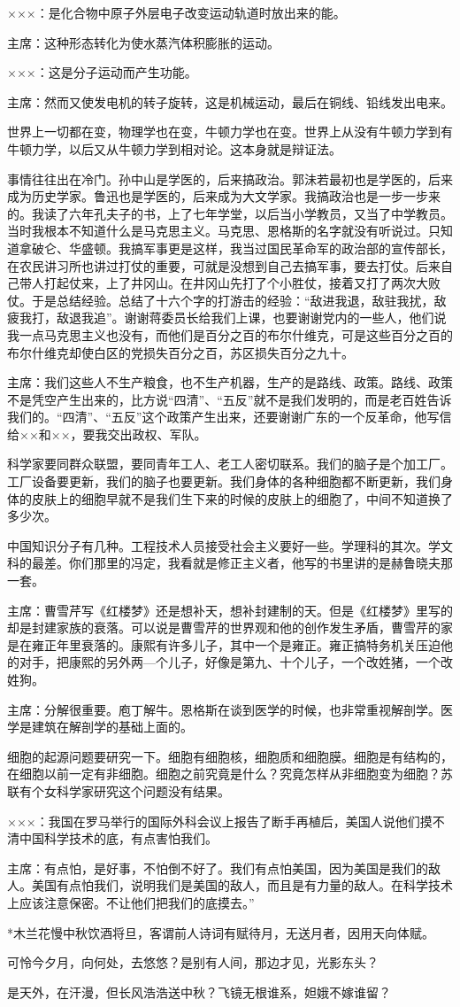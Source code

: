 ×××：是化合物中原子外层电子改变运动轨道时放出来的能。

主席：这种形态转化为使水蒸汽体积膨胀的运动。

×××：这是分子运动而产生功能。

主席：然而又使发电机的转子旋转，这是机械运动，最后在铜线、铅线发出电来。

世界上一切都在变，物理学也在变，牛顿力学也在变。世界上从没有牛顿力学到有牛顿力学，以后又从牛顿力学到相对论。这本身就是辩证法。

事情往往出在冷门。孙中山是学医的，后来搞政治。郭沬若最初也是学医的，后来成为历史学家。鲁迅也是学医的，后来成为大文学家。我搞政治也是一步一步来的。我读了六年孔夫子的书，上了七年学堂，以后当小学教员，又当了中学教员。当时我根本不知道什么是马克思主义。马克思、恩格斯的名字就没有听说过。只知道拿破仑、华盛顿。我搞军事更是这样，我当过国民革命军的政治部的宣传部长，在农民讲习所也讲过打仗的重要，可就是没想到自己去搞军事，要去打仗。后来自己带人打起仗来，上了井冈山。在井冈山先打了个小胜仗，接着又打了两次大败仗。于是总结经验。总结了十六个字的打游击的经验：“敌进我退，敌驻我扰，敌疲我打，敌退我追”。谢谢蒋委员长给我们上课，也要谢谢党内的一些人，他们说我一点马克思主义也没有，而他们是百分之百的布尔什维克，可是这些百分之百的布尔什维克却使白区的党损失百分之百，苏区损失百分之九十。

主席：我们这些人不生产粮食，也不生产机器，生产的是路线、政策。路线、政策不是凭空产生出来的，比方说“四清”、“五反”就不是我们发明的，而是老百姓告诉我们的。“四清”、“五反”这个政策产生出来，还要谢谢广东的一个反革命，他写信给××和××，要我交出政权、军队。

科学家要同群众联盟，要同青年工人、老工人密切联系。我们的脑子是个加工厂。工厂设备要更新，我们的脑子也要更新。我们身体的各种细胞都不断更新，我们身体的皮肤上的细胞早就不是我们生下来的时候的皮肤上的细胞了，中间不知道换了多少次。

中国知识分子有几种。工程技术人员接受社会主义要好一些。学理科的其次。学文科的最差。你们那里的冯定，我看就是修正主义者，他写的书里讲的是赫鲁晓夫那一套。

主席：曹雪芹写《红楼梦》还是想补天，想补封建制的天。但是《红楼梦》里写的却是封建家族的衰落。可以说是曹雪芹的世界观和他的创作发生矛盾，曹雪芹的家是在雍正年里衰落的。康熙有许多儿子，其中一个是雍正。雍正搞特务机关压迫他的对手，把康熙的另外两—个儿子，好像是第九、十个儿子，一个改姓猪，一个改姓狗。

主席：分解很重要。庖丁解牛。恩格斯在谈到医学的时候，也非常重视解剖学。医学是建筑在解剖学的基础上面的。

细胞的起源问题要研究一下。细胞有细胞核，细胞质和细胞膜。细胞是有结构的，在细胞以前一定有非细胞。细胞之前究竟是什么？究竟怎样从非细胞变为细胞？苏联有个女科学家研究这个问题没有结果。

×××：我国在罗马举行的国际外科会议上报告了断手再植后，美国人说他们摸不清中国科学技术的底，有点害怕我们。

主席：有点怕，是好事，不怕倒不好了。我们有点怕美国，因为美国是我们的敌人。美国有点怕我们，说明我们是美国的敌人，而且是有力量的敌人。在科学技术上应该注意保密。不让他们把我们的底摸去。”

*木兰花慢中秋饮酒将旦，客谓前人诗词有赋待月，无送月者，因用天向体赋。

可怜今夕月，向何处，去悠悠？是别有人间，那边才见，光影东头？

是天外，在汗漫，但长风浩浩送中秋？飞镜无根谁系，妲娥不嫁谁留？
